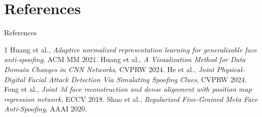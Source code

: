 \section{References}

\begin{frame}{References}
    \begin{thebibliography}{1}
        Huang et al., \emph{Adaptive normalized representation learning for generalizable face anti-spoofing}, ACM MM 2021.
        Huang et al., \emph{A Visualization Method for Data Domain Changes in CNN Networks}, CVPRW 2024.
        He et al., \emph{Joint Physical-Digital Facial Attack Detection Via Simulating Spoofing Clues}, CVPRW 2024.
        Feng et al., \emph{Joint 3d face reconstruction and dense alignment with position map regression network}, ECCV 2018.
        Shao et al., \emph{Regularized Fine-Grained Meta Face Anti-Spoofing}, AAAI 2020.
    \end{thebibliography}
\end{frame}


